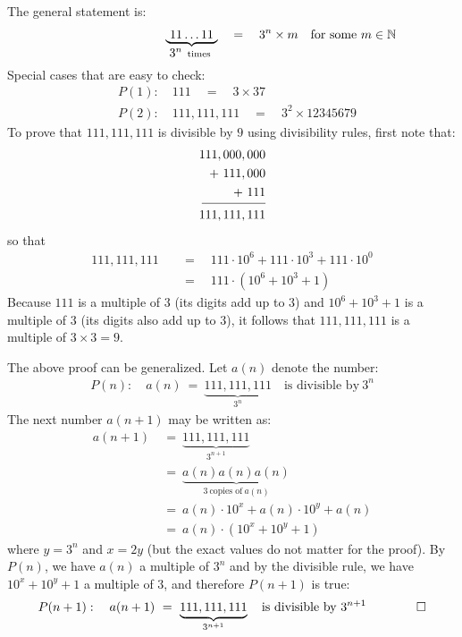 \documentclass[12pt]{article}
\begin{document}
The general statement is:
\begin{align*}
\underbrace{~11\ldots11~}_{\makebox[5pt]{$3^{n}$}~~\text{times}} 
 \quad=\quad 3^{n} \times m \mathrlap{\quad \text{for some}~ m\in\mathbb{N}}
\end{align*}
Special cases that are easy to check:
\begin{align*}
& P(1): \quad 111 \quad=\quad 3 \times 37 \\
& P(2): \quad 111,111,111 \quad=\quad 3^{2} \times 12345679
\end{align*}
To prove that $111,111,111$ is divisible by $9$ using divisibility rules, first note that:
\begin{align*}
111,000,000 & \\
+~111,000 &\\
+~111 & \\[-3\jot]
\rule{12ex}{0.4pt} \\[-1\jot]
111,111,111 & 
\end{align*}
so that 
\begin{align*}
111,111,111 
 & \quad=\quad 111 \cdot 10^{6} + 111 \cdot 10^{3} + 111 \cdot 10^{0} \\
 & \quad=\quad 111 \cdot (10^{6}+10^{3}+1)
\end{align*}
Because $111$ is a multiple of $3$ (its digits add up to $3$) and $10^{6}+10^{3}+1$ is a multiple of $3$ (its digits also add up to $3$), it follows that $111,111,111$ is a multiple of $3\times3=9$.

The above proof can be generalized. Let $a(n)$ denote the number:
\begin{align*}
P(n): \quad a(n) ~=~ \underbrace{111,111,111}_{3^{n}} \quad\text{is divisible by}~3^{n}
\end{align*}
The next number $a(n+1)$ may be written as:
\begin{align*}
a(n+1) 
 & ~=~ \underbrace{111,111,111}_{3^{n+1}} \\
 & ~=~ \underbrace{a(n) a(n) a(n)}_{3~\text{copies of}~a(n)} \\
 & ~=~ a(n) \cdot 10^{x} + a(n) \cdot 10^{y} + a(n) \\
 & ~=~ a(n) \cdot (10^{x} + 10^{y} + 1)
\end{align*}
where $y=3^{n}$ and $x=2y$ (but the exact values do not matter for the proof). By $P(n)$, we have $a(n)$ a multiple of $3^{n}$ and by the divisible rule, we have $10^{x}+10^{y}+1$ a multiple of $3$, and therefore $P(n+1)$ is true:
\begin{align*}
P(n+1): \quad a(n+1) ~=~ \underbrace{111,111,111}_{3^{n+1}} \quad\text{is divisible by}~3^{n+1} \qquad \qed
\end{align*}
\end{document}
